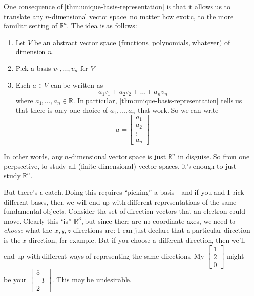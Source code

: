 \documentclass[10pt]{article}
\theoremstyle{definition}
\newcommand{\R}{\mathbb{R}}           %
\begin{document}
One consequence of \cref{thm:unique-basis-representation} is that it allows us
to translate any $n$-dimensional vector space, no matter how exotic, to the
more familiar setting of $\R^{n}$. The idea is as follows:
\begin{enumerate}
  \item Let $V$ be an abstract vector space (functions, polynomials, whatever)
  of dimension $n$.
  \item Pick a basis $v_{1},\ldots,v_{n}$ for $V$
  \item Each $a\in V$ can be written as
  \begin{equation*}
    a_{1}v_{1}+a_{2}v_{2}+\ldots+a_{n}v_{n}
  \end{equation*}
  where $a_{1},\ldots,a_{n}\in \R$. In particular,
  \cref{thm:unique-basis-representation} tells us that there is only one
  choice of $a_{1},\ldots,a_{n}$ that work. So we can write
  \begin{equation*}
    a =
    \begin{bmatrix}
      a_{1}\\
      a_{2}\\
      \vdots\\
      a_{n}
    \end{bmatrix}
  \end{equation*}
\end{enumerate}
In other words, any $n$-dimensional vector space is just $\R^{n}$ in disguise.
So from one perpsective, to study all (finite-dimensional) vector spaces, it's
enough to just study $\R^{n}$.

But there's a catch. Doing this requires ``picking'' a basis---and if you and
I pick different bases, then we will end up with different representations of
the same fundamental objects. Consider the set of direction vectors that an
electron could move. Clearly this ``is'' $\R^{3}$, but since there are no
coordinate axes, we need to \textit{choose} what the $x,y,z$ directions are: I
can just declare that a particular direction is the $x$ direction, for
example. But if you choose a different direction, then we'll end up with
different ways of representing the same directions. My $
\begin{bmatrix}
  1\\2\\0
\end{bmatrix} 
$ might be your $
\begin{bmatrix}
  5\\-3\\2
\end{bmatrix}
$. This may be undesirable.
\end{document}
